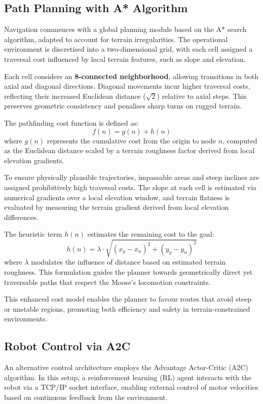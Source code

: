 \documentclass[11pt,twocolumn]{article}
\begin{document}
\subsection{Path Planning with A* Algorithm}

Navigation commences with a global planning module based on the A* search algorithm, adapted to account for terrain irregularities. The operational environment is discretised into a two-dimensional grid, with each cell assigned a traversal cost influenced by local terrain features, such as slope and elevation.

Each cell considers an \textbf{8-connected neighborhood}, allowing transitions in both axial and diagonal directions. Diagonal movements incur higher traversal costs, reflecting their increased Euclidean distance ($\sqrt{2}$) relative to axial steps. This preserves geometric consistency and penalises sharp turns on rugged terrain.

The pathfinding cost function is defined as:
\[
f(n) = g(n) + h(n)
\]
where $g(n)$ represents the cumulative cost from the origin to node $n$, computed as the Euclidean distance scaled by a terrain roughness factor derived from local elevation gradients. 

To ensure physically plausible trajectories, impassable areas and steep inclines are assigned prohibitively high traversal costs. The slope at each cell is estimated via numerical gradients over a local elevation window, and terrain flatness is evaluated by measuring the terrain gradient derived from local elevation differences.

The heuristic term $h(n)$ estimates the remaining cost to the goal:
\[
h(n) = \lambda \cdot \sqrt{(x_g - x_n)^2 + (y_g - y_n)^2}
\]
where $\lambda$ modulates the influence of distance based on estimated terrain roughness. This formulation guides the planner towards geometrically direct yet traversable paths that respect the Moose’s locomotion constraints.

This enhanced cost model enables the planner to favour routes that avoid steep or unstable regions, promoting both efficiency and safety in terrain-constrained environments.
\subsection{Robot Control via A2C}

An alternative control architecture employs the Advantage Actor-Critic (A2C) algorithm. In this setup, a reinforcement learning (RL) agent interacts with the robot via a TCP/IP socket interface, enabling external control of motor velocities based on continuous feedback from the environment.
\end{document}
